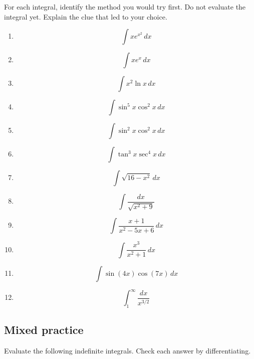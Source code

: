 For each integral, identify the method you would try first.  Do not evaluate the integral
yet.  Explain the clue that led to your choice.

\begin{enumerate}
\item
\[
\int x e^{x^2}\,dx
\]

\item
\[
\int x e^x\,dx
\]

\item
\[
\int x^2\ln x\,dx
\]

\item
\[
\int \sin^5x\cos^2x\,dx
\]

\item
\[
\int \sin^2x\cos^2x\,dx
\]

\item
\[
\int \tan^3x\sec^4x\,dx
\]

\item
\[
\int \sqrt{16-x^2}\,dx
\]

\item
\[
\int \frac{dx}{\sqrt{x^2+9}}
\]

\item
\[
\int \frac{x+1}{x^2-5x+6}\,dx
\]

\item
\[
\int \frac{x^3}{x^2+1}\,dx
\]

\item
\[
\int \sin(4x)\cos(7x)\,dx
\]

\item
\[
\int_1^\infty \frac{dx}{x^{3/2}}
\]
\end{enumerate}

\subsection{Mixed practice}
\label{subsec:chapter-11-mixed-practice}

Evaluate the following indefinite integrals.  Check each answer by differentiating.

